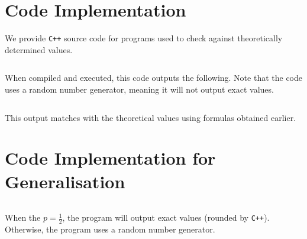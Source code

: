 \section{Code Implementation}
We provide \verb|C++| source code for programs used to check against theoretically determined values.
\inputminted{cpp}{code/ummrc.cpp}
When compiled and executed, this code outputs the following. Note that the code uses a random number generator, meaning it will not output exact values.
\inputminted[linenos = false]{text}{code/out1.txt}
This output matches with the theoretical values using formulas obtained earlier.
\section{Code Implementation for Generalisation}
\inputminted{cpp}{code/generalisation.cpp}
When the $p = \frac{1}{2}$, the program will output exact values (rounded by \verb|C++|). Otherwise, the program uses a random number generator.
\inputminted[linenos = false]{text}{code/out2.txt}
